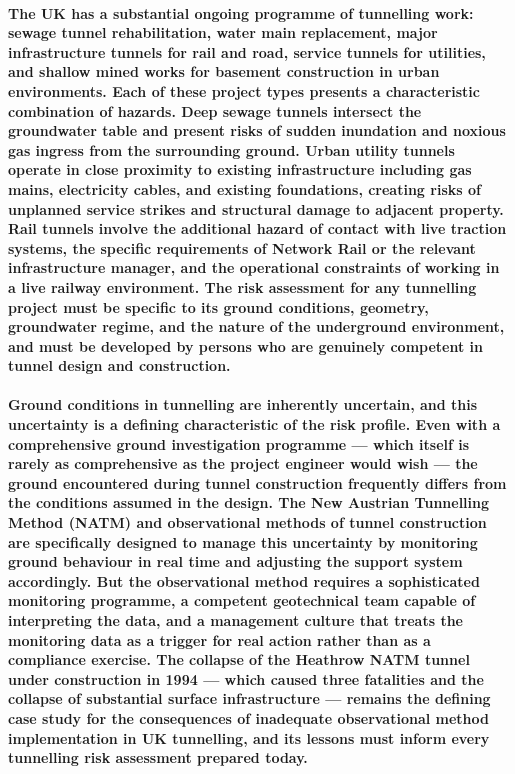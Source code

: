 \paragraph{The UK has a substantial ongoing programme of tunnelling work: sewage tunnel rehabilitation, water main replacement, major infrastructure tunnels for rail and road, service tunnels for utilities, and shallow mined works for basement construction in urban environments. Each of these project types presents a characteristic combination of hazards. Deep sewage tunnels intersect the groundwater table and present risks of sudden inundation and noxious gas ingress from the surrounding ground. Urban utility tunnels operate in close proximity to existing infrastructure including gas mains, electricity cables, and existing foundations, creating risks of unplanned service strikes and structural damage to adjacent property. Rail tunnels involve the additional hazard of contact with live traction systems, the specific requirements of Network Rail or the relevant infrastructure manager, and the operational constraints of working in a live railway environment. The risk assessment for any tunnelling project must be specific to its ground conditions, geometry, groundwater regime, and the nature of the underground environment, and must be developed by persons who are genuinely competent in tunnel design and construction.}

\paragraph{Ground conditions in tunnelling are inherently uncertain, and this uncertainty is a defining characteristic of the risk profile. Even with a comprehensive ground investigation programme --- which itself is rarely as comprehensive as the project engineer would wish --- the ground encountered during tunnel construction frequently differs from the conditions assumed in the design. The New Austrian Tunnelling Method (NATM) and observational methods of tunnel construction are specifically designed to manage this uncertainty by monitoring ground behaviour in real time and adjusting the support system accordingly. But the observational method requires a sophisticated monitoring programme, a competent geotechnical team capable of interpreting the data, and a management culture that treats the monitoring data as a trigger for real action rather than as a compliance exercise. The collapse of the Heathrow NATM tunnel under construction in 1994 --- which caused three fatalities and the collapse of substantial surface infrastructure --- remains the defining case study for the consequences of inadequate observational method implementation in UK tunnelling, and its lessons must inform every tunnelling risk assessment prepared today.}

